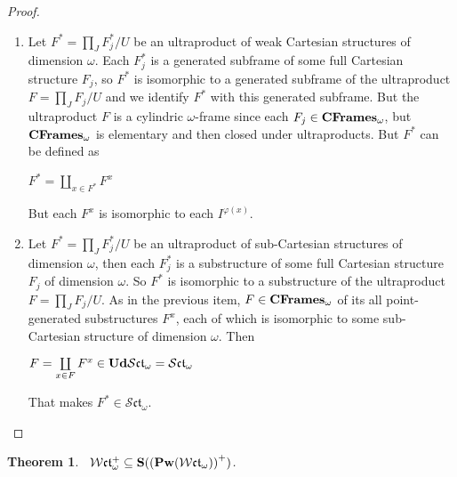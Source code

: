\documentclass{article}
\theoremstyle{defin}
\theoremstyle{theorem}
\newtheorem{theorem}{Theorem}
\theoremstyle{claim}
\theoremstyle{prop}
\theoremstyle{lemma}
\theoremstyle{fact}
\theoremstyle{remark}
\theoremstyle{ex}
\theoremstyle{col}
\theoremstyle{question}
\begin{document}
\begin{proof}
$ $
\begin{enumerate}
\item Let $F^* = \prod \limits_{J} F^*_j / U$ be an ultraproduct of weak Cartesian structures of dimension $\omega$. 
Each $F^*_j$ is a generated subframe of some full Cartesian structure $F_j$, 
so $F^*$ is isomorphic to a generated subframe of the ultraproduct 
$F = \prod \limits_{J} F_j / U$ and we identify $F^*$ with this generated subframe.
But the ultraproduct $F$ is a cylindric $\omega$-frame since each $F_j \in {\bf CFrames}_{\omega}$,
but ${\bf CFrames}_{\omega}$ is elementary and then closed under ultraproducts. 
But $F^*$ can be defined as
\begin{center}
$F^* = \coprod \limits_{x \in F^*} F^x$
\end{center}
But each $F^x$ is isomorphic to each $I^{\varphi(x)}$.
\item Let $F^* = \prod \limits_{J} F^*_j / U$ be an ultraproduct of sub-Cartesian structures of dimension 
$\omega$, then each $F^*_j$ is a substructure of some full Cartesian structure $F_j$ of dimension $\omega$.
So $F^*$ is isomorphic to a substructure of the ultraproduct $F = \prod \limits_{J} F_j / U$. 
As in the previous item, $F \in {\bf CFrames}_{\omega}$ of its all point-generated substructures $F^x$,
each of which is isomorphic to some sub-Cartesian structure of dimension $\omega$. Then
\begin{center}
$F = \coprod \limits_{x \in F} F^{x} \in {\bf Ud}\mathcal{S}\mathfrak{ct}_{\omega} = \mathcal{S}\mathfrak{ct}_{\omega}$
\end{center}
That makes $F^* \in \mathcal{S}\mathfrak{ct}_{\omega}$.
\end{enumerate}
\end{proof}

\begin{theorem}~\label{ultrapowers}
$\mathcal{W}\mathfrak{ct}_{\omega}^{+} \subseteq {\bf S} ({({\bf Pw}(\mathcal{W}\mathfrak{ct}_{\omega}))}^{+})$.
\end{theorem}
\end{document}
